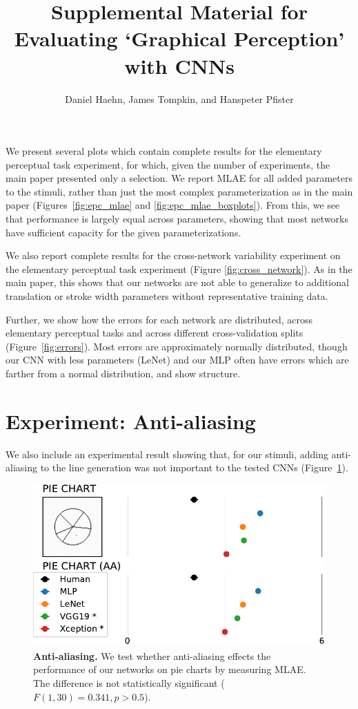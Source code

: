 \documentclass[journal]{vgtc}                %
\title{Supplemental Material for\\Evaluating `Graphical Perception' with CNNs}
\author{Daniel Haehn, James Tompkin, and Hanspeter Pfister}
\begin{document}
\maketitle

We present several plots which contain complete results for the elementary perceptual task experiment, for which, given the number of experiments, the main paper presented only a selection. We report MLAE for all added parameters to the stimuli, rather than just the most complex parameterization as in the main paper (Figures~\ref{fig:epc_mlae} and \ref{fig:epc_mlae_boxplots}). From this, we see that performance is largely equal across parameters, showing that most networks have sufficient capacity for the given parameterizations.

We also report complete results for the cross-network variability experiment on the elementary perceptual task experiment (Figure \ref{fig:cross_network}). As in the main paper, this shows that our networks are not able to generalize to additional translation or stroke width parameters without representative training data.

Further, we show how the errors for each network are distributed, across elementary perceptual tasks and across different cross-validation splits (Figure~\ref{fig:errors}). Most errors are approximately normally distributed, though our CNN with less parameters (LeNet) and our MLP often have errors which are farther from a normal distribution, and show structure.

\section{Experiment: Anti-aliasing}
We also include an experimental result showing that, for our stimuli, adding anti-aliasing to the line generation was not important to the tested CNNs (Figure~\ref{fig:aa}).

\begin{figure}[h]
\centering
\includegraphics[width=\linewidth]{../gfx/figure3_mlae_better_all_AA.pdf}
\caption{\textbf{Anti-aliasing.} We test whether anti-aliasing effects the performance of our networks on pie charts by measuring MLAE. The difference is not statistically significant ($F(1,30)=0.341,p>0.5$).}
\label{fig:aa}
\end{figure}
\end{document}
